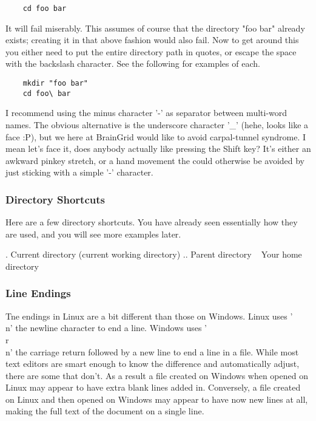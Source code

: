 	\begin{verbatim}
	cd foo bar
	\end{verbatim}

It will fail miserably.  This assumes of course that the directory "foo bar" already exists; creating it in that above fashion would also fail.  Now to get around this you either need to put the entire directory path in quotes, or escape the space with the backslash character.  See the following for examples of each.

	\begin{verbatim}
	mkdir "foo bar"
	cd foo\ bar
	\end{verbatim}

I recommend using the minus character '-' as separator between multi-word names.  The obvious alternative is the underscore character '\_' (hehe, looks like a face :P), but we here at BrainGrid would like to avoid carpal-tunnel syndrome.  I mean let's face it, does anybody actually like pressing the Shift key?  It's either an awkward pinkey stretch, or a hand movement the could otherwise be avoided by just sticking with a simple '-' character.  


\subsubsection{Directory Shortcuts} \mdseries
Here are a few directory shortcuts.  You have already seen essentially how they are used, and you will see more examples later.

	.	Current directory (current working directory)
	..	Parent directory
	~	Your home directory


\subsubsection{Line Endings} \mdseries
Tne endings in Linux are a bit different than those on Windows.  Linux uses '\\n' the newline character to end a line.  Windows uses '\\r\\n' the carriage return followed by a new line to end a line in a file.  While most text editors are smart enough to know the difference and automatically adjust, there are some that don't.  As a result a file created on Windows when opened on Linux may appear to have extra blank lines added in.  Conversely, a file created on Linux and then opened on Windows may appear to have now new lines at all, making the full text of the document on a single line.


